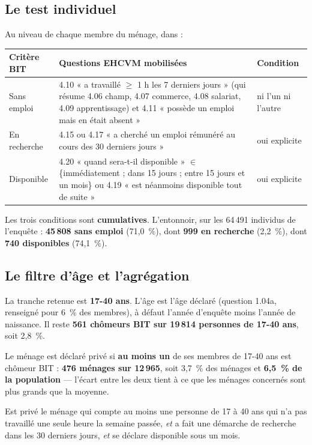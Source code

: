 \documentclass[11pt,a4paper]{article}
\begin{document}
\subsection{Le test individuel}

Au niveau de chaque membre du ménage, dans
 :

\begin{center}
\small
\begin{tabular}{@{}p{2.2cm}p{7.4cm}p{2.6cm}@{}}
\toprule
\textbf{Critère BIT} & \textbf{Questions EHCVM mobilisées} & \textbf{Condition} \\
\midrule
Sans emploi & 4.10 « a travaillé $\ge$ 1 h les 7 derniers jours » (qui résume 4.06 champ,
4.07 commerce, 4.08 salariat, 4.09 apprentissage) et 4.11 « possède un emploi mais en était
absent » & ni l'un ni l'autre \\
En recherche & 4.15 ou 4.17 « a cherché un emploi rémunéré au cours des 30 derniers jours » &
oui explicite \\
Disponible & 4.20 « quand sera-t-il disponible » $\in$ \{immédiatement ; dans 15 jours ;
entre 15 jours et un mois\} ou 4.19 « est néanmoins disponible tout de suite » & oui explicite \\
\bottomrule
\end{tabular}
\end{center}

Les trois conditions sont \textbf{cumulatives}. L'entonnoir, sur les 64\,491 individus de
l'enquête : \textbf{45\,808 sans emploi} (71,0~\%), dont \textbf{999 en recherche} (2,2~\%), dont
\textbf{740 disponibles} (74,1~\%).

\subsection{Le filtre d'âge et l'agrégation}

La tranche retenue est \textbf{17-40 ans}. L'âge est l'âge déclaré (question 1.04a, renseigné pour
6~\% des membres), à défaut l'année d'enquête moins l'année de naissance. Il reste
\textbf{561 chômeurs BIT sur 19\,814 personnes de 17-40 ans}, soit 2,8~\%.

Le ménage est déclaré privé si \textbf{au moins un} de ses membres de 17-40 ans est chômeur BIT :
\textbf{476 ménages sur 12\,965}, soit 3,7~\% des ménages et \textbf{6,5~\% de la population}
--- l'écart entre les deux tient à ce que les ménages concernés sont plus grands que la moyenne.

\begin{retenir}
Est privé le ménage qui compte au moins une personne de 17 à 40 ans qui n'a pas travaillé une
seule heure la semaine passée, \emph{et} a fait une démarche de recherche dans les 30 derniers
jours, \emph{et} se déclare disponible sous un mois.
\end{retenir}
\end{document}
